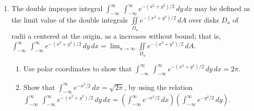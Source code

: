 \documentclass{exercises}
\begin{document}
\begin{enumerate}[resume]
\item The double improper integral $\int_{-\infty}^{\infty}\,\int_{-\infty}^{\infty}e^{-(x^{2}+y^{2})/2}\,dy\,dx$ may be defined as the limit value of the double integrals $\underset{D_{a}}{\iint}e^{-(x^{2}+y^{2})/2}\,dA$ over disks $D_{a}$ of radii a centered at the origin, as a increases without bound; that is, $\int_{-\infty}^{\infty}\,\int_{-\infty}^{\infty}e^{-(x^{2}+y^{2})/2}\,dy\,dx=\lim_{a\to \infty}\underset{D_{a}}{\iint}e^{-(x^{2}+y^{2})/2}\,dA$.
\begin{enumerate}[label=(\alph*)]
  \item Use polar coordinates to show that $\int_{-\infty}^{\infty}\,\int_{-\infty}^{\infty}e^{-(x^{2}+y^{2})/2}\,dy\,dx=2\pi$.
  \item Show that $\int_{-\infty}^{\infty}e^{-x^{2}/2}\,dx=\sqrt{2\pi}$, by using the relation $\int_{-\infty}^{\infty}\,\int_{-\infty}^{\infty}e^{-(x^{2}+y^{2})/2}\,dy\,dx=(\int_{-\infty}^{\infty}e^{-x^{2}/2}\,dx)(\int_{-\infty}^{\infty}e^{-y^{2}/2}\,dy)$.
\end{enumerate}
\end{enumerate}
\end{document}

